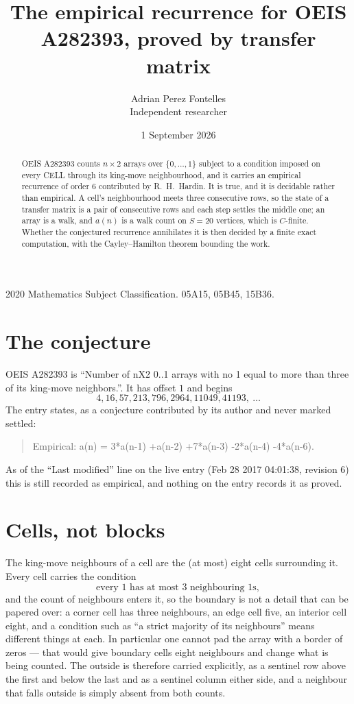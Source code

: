 \documentclass[11pt,a4paper]{article}
\title{The empirical recurrence for OEIS A282393, proved by transfer matrix}
\author{Adrian Perez Fontelles\\ \small Independent researcher}
\date{1 September 2026}
\theoremstyle{plain}
\theoremstyle{definition}
\begin{document}
\maketitle

\begin{abstract}
OEIS A282393 counts $n\times2$ arrays over $\{0,\dots,1\}$ subject to a condition imposed on
every CELL through its king-move neighbourhood, and it carries an empirical recurrence of
order $6$ contributed by R.~H.~Hardin. It is true, and it is decidable rather than
empirical. A cell's neighbourhood meets three consecutive rows, so the state of a transfer
matrix is a pair of consecutive rows and each step settles the middle one; an array is a
walk, and $a(n)$ is a walk count on $S=20$ vertices, which is $C$-finite. Whether the
conjectured recurrence annihilates it is then decided by a finite exact computation, with the
Cayley--Hamilton theorem bounding the work.
\end{abstract}

\noindent\small 2020 Mathematics Subject Classification. 05A15, 05B45, 15B36.\normalsize

\section{The conjecture}

OEIS A282393 is ``Number of nX2 0..1 arrays with no 1 equal to more than three of its king-move neighbors.''. It has offset $1$ and begins
\[
4, 16, 57, 213, 796, 2964, 11049, 41193,\ \dots
\]
The entry states, as a conjecture contributed by its author and never marked settled:
\begin{quote}
Empirical: a(n) = 3*a(n-1) +a(n-2) +7*a(n-3) -2*a(n-4) -4*a(n-6).
\end{quote}
As of the ``Last modified'' line on the live entry (Feb 28 2017 04:01:38, revision 6) this is still
recorded as empirical, and nothing on the entry records it as proved.

\section{Cells, not blocks}

The king-move neighbours of a cell are the (at most) eight cells surrounding it. Every cell
carries the condition
\[
\text{every }1\text{ has at most }3\text{ neighbouring }1\text{s},
\]
and the count of neighbours enters it, so the boundary is not a detail that can be papered
over: a corner cell has three neighbours, an edge cell five, an interior cell eight, and a
condition such as ``a strict majority of its neighbours'' means different things at each. In
particular one cannot pad the array with a border of zeros --- that would give boundary cells
eight neighbours and change what is being counted. The outside is therefore carried
explicitly, as a sentinel row above the first and below the last and as a sentinel column
either side, and a neighbour that falls outside is simply absent from both counts.
\end{document}
